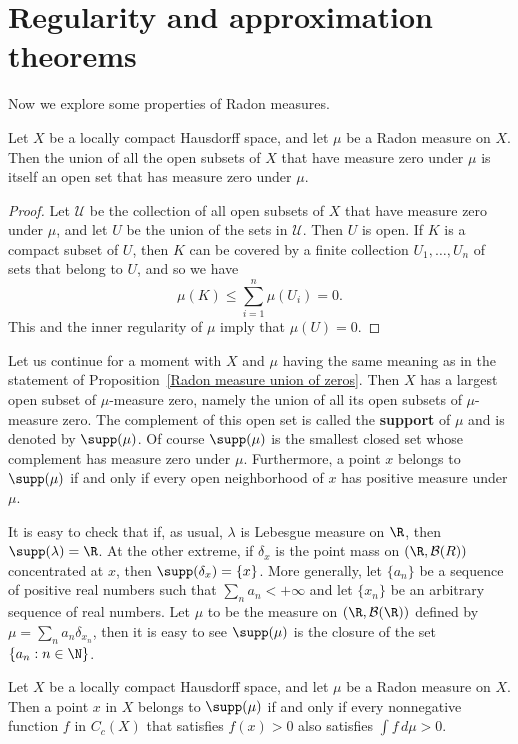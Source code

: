 \section{Regularity and approximation theorems}
Now we explore some properties of Radon measures.
\begin{proposition}\label{Radon measure union of zeros}
Let $X$ be a locally compact Hausdorff space, and let $\mu$ be a Radon measure on $X$. Then the union of all the open subsets of $X$ that have measure zero under $\mu$ is itself an open set that has measure zero under $\mu$.
\end{proposition}
\begin{proof}
Let $\mathcal{U}$ be the collection of all open subsets of $X$ that have measure zero under $\mu$, and let $U$ be the union of the sets in $\mathcal{U}$. Then $U$ is open. If $K$ is a compact subset of $U$, then $K$ can be covered by a finite collection $U_1,\dots,U_n$ of sets that belong to $U$, and so we have
\[\mu(K)\leq\sum_{i=1}^{n}\mu(U_i)=0.\]
This and the inner regularity of $\mu$ imply that $\mu(U)=0$.
\end{proof}
Let us continue for a moment with $X$ and $\mu$ having the same meaning as in the statement of Proposition~\ref{Radon measure union of zeros}. Then $X$ has a largest open subset of $\mu$-measure zero, namely the union of all its open subsets of $\mu$-measure zero. The complement of this open set is called the \textbf{support} of $\mu$ and is denoted by $\supp(\mu)$. Of course $\supp(\mu)$ is the smallest closed set whose complement has measure zero under $\mu$. Furthermore, a point $x$ belongs to $\supp(\mu)$ if and only if every open neighborhood of $x$ has positive measure under $\mu$.
\begin{example}
It is easy to check that if, as usual, $\lambda$ is Lebesgue measure on $\R$, then $\supp(\lambda)=\R$. At the other extreme, if $\delta_x$ is the point mass on $(\R,\mathcal{B}(R))$ concentrated at $x$, then $\supp(\delta_x)=\{x\}$. More generally, let $\{a_n\}$ be a sequence of positive real numbers such that $\sum_na_n<+\infty$ and let $\{x_n\}$ be an arbitrary sequence of real numbers. Let $\mu$ to be the measure on $(\R,\mathcal{B}(\R))$ defined by $\mu=\sum_na_n\delta_{x_n}$, then it is easy to see $\supp(\mu)$ is the closure of the set $\{a_n:n\in\N\}$.
\end{example}
\begin{proposition}\label{Radon measure in support iff}
Let $X$ be a locally compact Hausdorff space, and let $\mu$ be a Radon measure on $X$. Then a point $x$ in $X$ belongs to $\supp(\mu)$ if and only if every nonnegative function $f$ in $C_c(X)$ that satisfies $f(x)>0$ also satisfies $\int f\,d\mu>0$.
\end{proposition}
